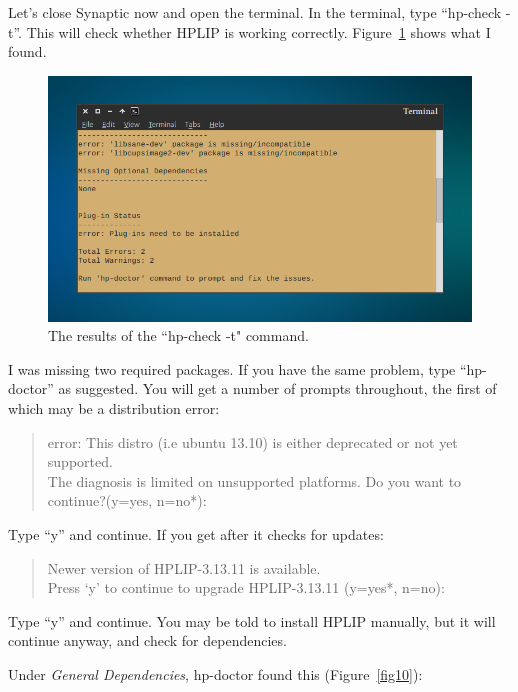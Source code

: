 \documentclass[12pt, a4paper]{article}
\begin{document}
Let's close Synaptic now and open the terminal. In the terminal, type “hp-check -t”. This will check whether HPLIP is working correctly. Figure~\ref{fig9} shows what I found.

\begin{figure}[!hbp]
  \centering
  \includegraphics[width=1\textwidth]{imgs/Filter_failed_10.png}
  \caption{The results of the ``hp-check -t" command.}
  \label{fig9}
\end{figure}

\noindent I was missing two required packages. If you have the same problem, type “hp-doctor” as suggested. You will get a number of prompts throughout, the first of which may be a distribution error:

\begin{quote}error: This distro (i.e ubuntu 13.10) is either deprecated or not yet supported.\\
The diagnosis is limited on unsupported platforms. Do you want to continue?(y=yes, n=no*):
\end{quote}

\noindent Type “y” and continue. If you get after it checks for updates:

\begin{quote}
Newer version of HPLIP-3.13.11 is available.\\
Press `y' to continue to upgrade HPLIP-3.13.11 (y=yes*, n=no):
\end{quote}

\noindent Type “y” and continue. You may be told to install HPLIP manually, but it will continue anyway, and check for dependencies.

Under \emph{General Dependencies}, hp-doctor found this (Figure~\ref{fig10}):
\end{document}
